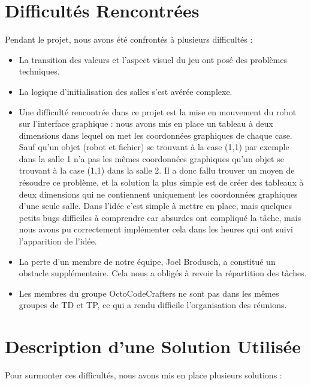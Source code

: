 \documentclass{article}
\begin{document}
\section{Difficultés Rencontrées}
Pendant le projet, nous avons été confrontés à plusieurs difficultés :

\begin{itemize}
\item La transition des valeurs et l'aspect visuel du jeu ont posé des problèmes techniques.
\item La logique d'initialisation des salles s'est avérée complexe.
\item Une difficulté rencontrée dans ce projet est la mise en mouvement du robot sur l'interface graphique : nous avons mis en place un tableau à deux dimensions dans lequel on met les coordonnées graphiques de chaque case. Sauf qu'un objet (robot et fichier) se trouvant à la case (1,1) par exemple dans la salle 1 n'a pas les mêmes coordonnées graphiques qu'un objet se trouvant à la case (1,1) dans la salle 2. Il a donc fallu trouver un moyen de résoudre ce problème, et la solution la plus simple est de créer des tableaux à deux dimensions qui ne contiennent uniquement les coordonnées graphiques d'une seule salle. Dans l'idée c'est simple à mettre en place, mais quelques petits bugs difficiles à comprendre car absurdes ont compliqué la tâche, mais nous avons pu correctement implémenter cela dans les heures qui ont suivi l'apparition de l'idée.
\item La perte d'un membre de notre équipe, Joel Brodusch, a constitué un obstacle supplémentaire. Cela nous a obligés à revoir la répartition des tâches.
\item Les membres du groupe OctoCodeCrafters ne sont pas dans les mêmes groupes de TD et TP, ce qui a rendu difficile l'organisation des réunions.
\end{itemize}

\section{Description d'une Solution Utilisée}
Pour surmonter ces difficultés, nous avons mis en place plusieurs solutions :
\end{document}
